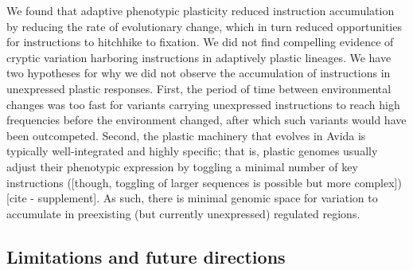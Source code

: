 We found that adaptive phenotypic plasticity reduced  instruction accumulation by reducing the rate of evolutionary change, which in turn reduced opportunities for  instructions to hitchhike to fixation.
We did not find compelling evidence of cryptic variation harboring  instructions in adaptively plastic lineages.
We have two hypotheses for why we did not observe the accumulation of  instructions in unexpressed plastic responses.
First, the period of time between environmental changes was too fast for variants carrying unexpressed  instructions to reach high frequencies before the environment changed, after which such variants would have been outcompeted.
Second, the plastic machinery that evolves in Avida is typically well-integrated and highly specific; that is, plastic genomes usually adjust their phenotypic expression by toggling a minimal number of key instructions ([though, toggling of larger sequences is possible but more complex]) [cite - supplement].
As such, there is minimal genomic space for variation to accumulate in preexisting (but currently unexpressed) regulated regions.



\vspace{0.25cm}
\subsection{Limitations and future directions}


